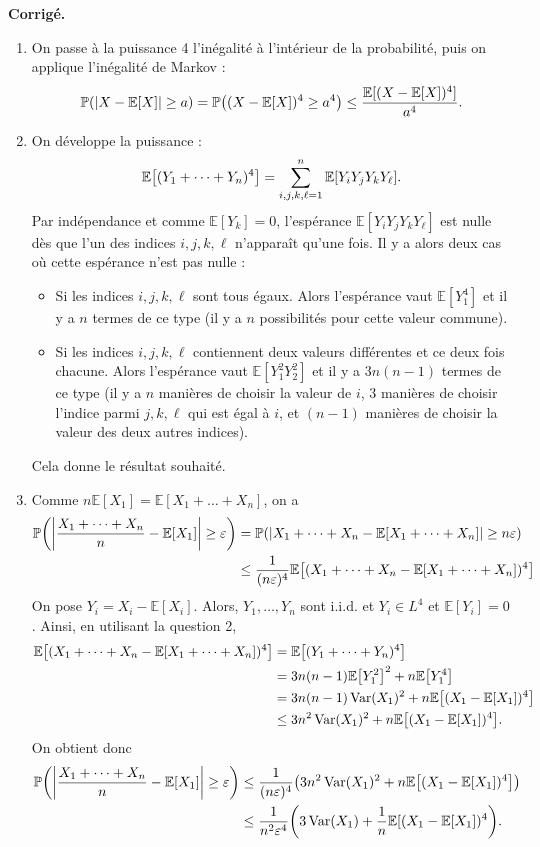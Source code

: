 \documentclass[a4paper,11pt]{article}
\let\originalleft\left
\let\originalright\right
\renewcommand{\left}{\mathopen{}\mathclose\bgroup\originalleft}
\renewcommand{\right}{\aftergroup\egroup\originalright}
\renewcommand{\P}{\mathbb{P}}
\newcommand{\E}{\mathbb{E}}
\newcommand{\1}{\mathbbm{1}}
\newcommand{\Ec}[1]{\mathbb{E} \left[#1\right]}
\newcommand{\Pp}[1]{\mathbb{P} \left(#1\right)}
\DeclareMathOperator{\Var}{Var}
\newcommand{\abs}[1]{\left\lvert#1\right\rvert}
\theoremstyle{plain}
\theoremstyle{definition}
\renewenvironment{comment}{\medskip\noindent \textcolor{BrickRed}{\textbf{Corrigé.}}}{}
\begin{document}
\begin{comment}
\begin{enumerate}
\item On passe à la puissance 4 l'inégalité à l'intérieur de la probabilité, puis on applique l'inégalité de Markov :
\[
\P(\abs{X-\E[X]} \geq a) 
= \Pp{(X-\E[X])^4 \geq a^4}
\leq \frac{\E[(X-\E[X])^4]}{a^4}.
\]
\item On développe la puissance :
\[
\Ec{(Y_1 + \dots + Y_n)^4}
= \sum_{i,j,k,\ell=1}^n \E[Y_iY_jY_kY_\ell].
\]
Par indépendance et comme $\E[Y_k]=0$, l'espérance $\E[Y_iY_jY_kY_\ell]$ est nulle dès que l'un des indices $i,j,k,\ell$ n'apparaît qu'une fois. Il y a alors deux cas où cette espérance n'est pas nulle :
\begin{itemize}
\item Si les indices $i,j,k,\ell$ sont tous égaux. Alors l'espérance vaut $\E[Y_1^4]$ et il y a $n$ termes de ce type (il y a $n$ possibilités pour cette valeur commune).
\item Si les indices $i,j,k,\ell$ contiennent deux valeurs différentes et ce deux fois chacune. Alors l'espérance vaut $\E[Y_1^2 Y_2^2]$ et il y a $3n(n-1)$ termes de ce type (il y a $n$ manières de choisir la valeur de $i$, 3 manières de choisir l'indice parmi $j,k,\ell$ qui est égal à $i$, et $(n-1)$ manières de choisir la valeur des deux autres indices).
\end{itemize}
Cela donne le résultat souhaité.
\item Comme $n\E[X_1] = \E[X_1 + \dots + X_n]$, on a
\begin{align*}
\Pp{ \abs{\frac{X_1 + \dots + X_n}{n} - \E[X_1]} \geq \varepsilon}
& = \Pp{ \abs{X_1 + \dots + X_n - \E[X_1 + \dots + X_n]} \geq n\varepsilon} \\
& \leq \frac{1}{(n\varepsilon)^4} 
\Ec{(X_1 + \dots + X_n - \E[X_1 + \dots + X_n])^4 }
\end{align*}
On pose $Y_i = X_i - \E[X_i]$. Alors, $Y_1,\dots,Y_n$ sont i.i.d. et $Y_i \in L^4$ et $\E[Y_i] = 0$.
Ainsi, en utilisant la question 2,
\begin{align*}
\Ec{(X_1 + \dots + X_n - \E[X_1 + \dots + X_n])^4 }
& = \Ec{(Y_1 + \dots + Y_n)^4} \\
& = 3 n (n-1) \Ec{Y_1^2}^2 + n \Ec{Y_1^4}  \\
& = 3 n (n-1) \Var(X_1)^2 + n \Ec{(X_1-\E[X_1])^4} \\
& \leq 3 n^2 \Var(X_1)^2 + n \Ec{(X_1-\E[X_1])^4}.
\end{align*}
On obtient donc
\begin{align*}
\Pp{ \abs{\frac{X_1 + \dots + X_n}{n} - \E[X_1]} \geq \varepsilon}
& \leq \frac{1}{(n\varepsilon)^4} 
\left( 3 n^2 \Var(X_1)^2 + n \Ec{(X_1-\E[X_1])^4} \right) \\
& \leq \frac{1}{n^2\varepsilon^4} 
\left( 3 \Var(X_1) + \frac{1}{n} \E[(X_1-\E[X_1])^4 \right).
\end{align*}
\end{enumerate}
\end{comment}
\end{document}
